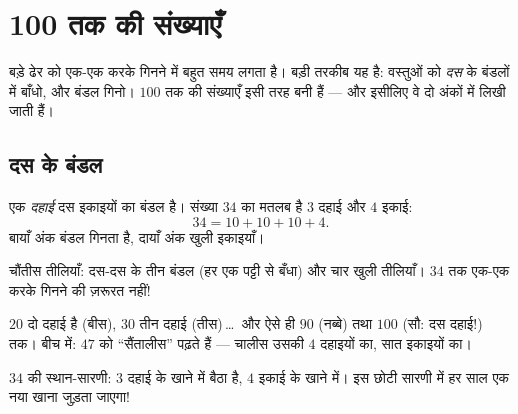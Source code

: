 \chapter{100 तक की संख्याएँ}\label{ch:g1:tens}

बड़े ढेर को एक-एक करके गिनने में बहुत समय लगता है। बड़ी तरकीब यह
है: वस्तुओं को \emph{दस} के बंडलों में बाँधो, और बंडल गिनो। $100$
तक की संख्याएँ इसी तरह बनी हैं --- और इसीलिए वे दो अंकों में
लिखी जाती हैं।

\section{दस के बंडल}

\begin{definition}[दहाई और इकाई]\label{def:g1:tens:def}
एक \emph{दहाई} दस इकाइयों का बंडल है। संख्या $34$ का मतलब है $3$
दहाई और $4$ इकाई:
\[
34 = 10 + 10 + 10 + 4 .
\]
बायाँ अंक बंडल गिनता है, दायाँ अंक खुली इकाइयाँ।
\end{definition}

\begin{omfigure}

{\small चौंतीस तीलियाँ: दस-दस के तीन बंडल (हर एक पट्टी से बँधा)
और चार खुली तीलियाँ। $34$ तक एक-एक करके गिनने की ज़रूरत नहीं!}
\end{omfigure}

\begin{example}[संख्याएँ पढ़ना]\label{ex:g1:tens:reading}
$20$ दो दहाई है (बीस), $30$ तीन दहाई (तीस)\,\dots\ और ऐसे ही
$90$ (नब्बे) तथा $100$ (सौ: दस दहाई!) तक। बीच में:
$47$ को ``सैंतालीस'' पढ़ते हैं --- चालीस उसकी $4$ दहाइयों का,
सात इकाइयों का।
\end{example}

\begin{omfigure}

{\small $34$ की स्थान-सारणी: $3$ दहाई के खाने में बैठा है, $4$
इकाई के खाने में। इस छोटी सारणी में हर साल एक नया खाना जुड़ता
जाएगा!}
\end{omfigure}

